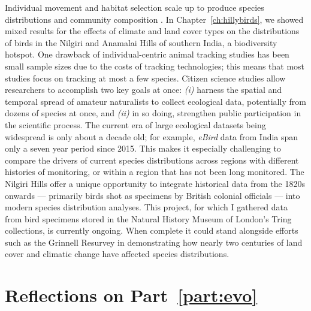 Individual movement and habitat selection scale up to produce species distributions and community composition \citep{schlagel2020a}.
In Chapter~\ref{ch:hillybirds}, we showed mixed results for the effects of climate and land cover types on the distributions of birds in the Nilgiri and Anamalai Hills of southern India, a biodiversity hotspot.
One drawback of individual-centric animal tracking studies has been small sample sizes due to the costs of tracking technologies; this means that most studies focus on tracking at most a few species.
Citizen science studies allow researchers to accomplish two key goals at once: \textit{(i)} harness the spatial and temporal spread of amateur naturalists to collect ecological data, potentially from dozens of species at once, and \textit{(ii)} in so doing, strengthen public participation in the scientific process.
The current era of large ecological datasets being widespread is only about a decade old; for example, \textit{eBird} data from India span only a seven year period since 2015.
This makes it especially challenging to compare the drivers of current species distributions across regions with different histories of monitoring, or within a region that has not been long monitored.
The Nilgiri Hills offer a unique opportunity to integrate historical data from the 1820s onwards --- primarily birds shot as specimens by British colonial officials --- into modern species distribution analyses.
This project, for which I gathered data from bird specimens stored in the Natural History Museum of London's Tring collections, is currently ongoing.
When complete it could stand alongside efforts such as the Grinnell Resurvey \citep{tingley2009a,tingley2009b} in demonstrating how nearly two centuries of land cover and climatic change have affected species distributions.

\section*{Reflections on Part~\ref{part:evo}}

